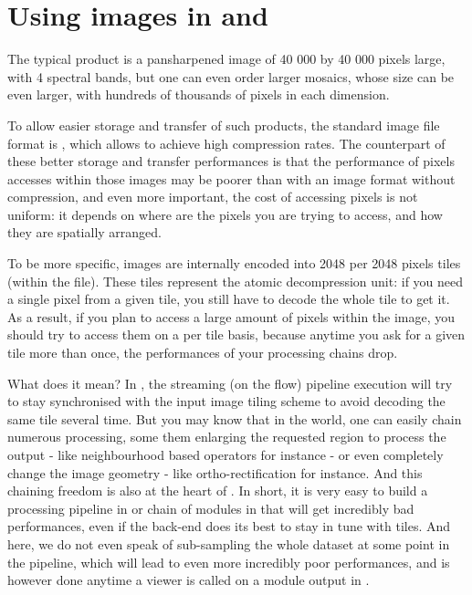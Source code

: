 %
\let\itk@OldTheindex=\theindex
\renewcommand{\theindex}{
  \cleardoublepage
  \itk@OldTheindex
  \addcontentsline{toc}{chapter}{\indexname}
}




\newpage
\section{Using \phr images in \app and \mont}\label{sec:pleiades}

The typical \phr product is a pansharpened image of 40 000 by 40
000 pixels large, with 4 spectral bands, but one can even order larger
mosaics, whose size can be even larger, with hundreds of thousands of
pixels in each dimension.

To allow easier storage and transfer of such products, the standard
image file format is \jpg, which allows to achieve high
compression rates. The counterpart of these better storage and
transfer performances is that the performance of pixels accesses
within those images may be poorer than with an image format without
compression, and even more important, the cost of accessing pixels is
not uniform: it depends on where are the pixels you are trying to
access, and how they are spatially arranged.

To be more specific, \phr images are internally encoded into 2048
per 2048 pixels tiles (within the \jpg file). These tiles
represent the atomic decompression unit: if you need a single pixel
from a given tile, you still have to decode the whole tile to get
it. As a result, if you plan to access a large amount of pixels within
the image, you should try to access them on a per tile basis, because
anytime you ask for a given tile more than once, the performances of
your processing chains drop.

What does it mean? In \otb, the streaming (on the flow) pipeline
execution will try to stay synchronised with the input image tiling
scheme to avoid decoding the same tile several time. But you may know
that in the \otb world, one can easily chain numerous processing, some
them enlarging the requested region to process the output - like
neighbourhood based operators for instance - or even completely change
the image geometry - like ortho-rectification for instance. And this
chaining freedom is also at the heart of \mont. In short, it is
very easy to build a processing pipeline in \otb or chain of modules in
\mont that will get incredibly bad performances, even if the \otb
back-end does its best to stay in tune with tiles. And here, we do not
even speak of sub-sampling the whole dataset at some point in the
pipeline, which will lead to even more incredibly poor performances,
and is however done anytime a viewer is called on a module output in
\mont.

